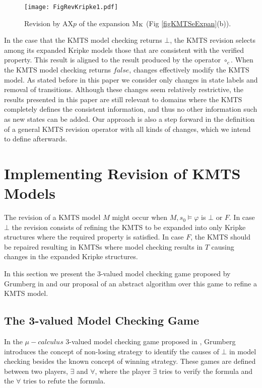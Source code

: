 \documentclass{llncs}
\begin{document}
\begin{figure}[h]
\centering
\texttt{[image: FigRevKripke1.pdf]}
\caption{Revision by AX$p$ of the expansion M$_{\mbox{\scriptsize K}}$ (Fig \ref{figKMTSeExpan}(b)).}
\label{figRevKripke1}
\vspace*{-0.5cm}
\end{figure}

In the case that the KMTS model checking returns $\bot$, the KMTS revision selects among its expanded Kripke models those that are consistent with the verified property. This result is aligned to the result produced by the operator $ \circ_c $. When the KMTS model checking returns $false$, changes effectively modify the KMTS model. As stated before in this paper we consider only changes in state labels and removal of transitions. Although these changes seem relatively restrictive, the results presented in this paper are still relevant to domains where the KMTS completely defines the consistent information, and thus no other information such as new states can be added. Our approach is also a step forward in the definition of a general KMTS revision operator with all kinds of changes, which we intend to define afterwards. 

\section{Implementing Revision of KMTS Models}
\label{secImpl}

The revision of a KMTS model $M$ might occur when $M,s_{0} \models \varphi$ is $\bot$ or $F$. In case $\bot$ the revision consists of refining the KMTS to be expanded into only Kripke structures where the required property is satisfied. In case $F$, the KMTS should be repaired resulting in KMTSs where model checking results in  $T$ causing changes in the expanded Kripke structures. 

In this section we present the 3-valued model checking game proposed by Grumberg in \cite{GLLS07} and our proposal of an abstract algorithm over this game to refine a KMTS model. 

\subsection{The 3-valued Model Checking Game} \label{secModCheGame}
In the $\mu-calculus$ 3-valued model checking game proposed in \cite{GLLS07}, Grumberg introduces the concept of non-losing strategy to identify the causes of $\bot$ in model checking besides the known concept of winning strategy. These games are defined between two players, $\exists$ and $\forall$, where the player $\exists$ tries to verify the formula and the $\forall$ tries to refute the formula. 
\end{document}
